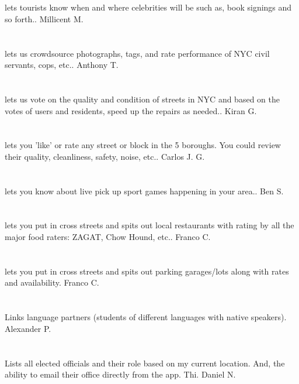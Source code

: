 \section{}lets tourists know when and where celebrities will be such as,  book signings and so forth.. Millicent M.
\section{}lets us crowdsource photographs,  tags,  and rate performance of NYC civil servants,  cops,  etc.. Anthony T.
\section{}lets us vote on the quality and condition of streets in NYC and based on the votes of users and residents,  speed up the repairs as needed.. Kiran G.
\section{}lets you 'like' or rate any street or block in the 5 boroughs. You could review their quality,  cleanliness,  safety,  noise,  etc.. Carlos J.  G.
\section{}lets you know about live pick up sport games happening in your area.. Ben S.
\section{}lets you put in cross streets and spits out local restaurants with rating by all the major food raters:  ZAGAT,  Chow Hound,  etc.. Franco C.
\section{}lets you put in cross streets and spits out parking garages/lots  along with rates and availability. Franco C.
\section{}Links language partners (students of different languages with native speakers). Alexander P.
\section{}Lists all elected officials and their role based on my current location. And,  the ability to email their office directly from the app.   Thi. Daniel N.
